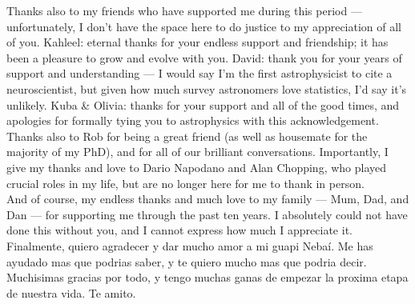 \newpage
\thispagestyle{empty}
Thanks also to my friends who have supported me during this period --- unfortunately, I don't have the space here to do justice to my appreciation of all of you. Kahleel: eternal thanks for your endless support and friendship; it has been a pleasure to grow and evolve with you. David: thank you for your years of support and understanding --- I would say I'm the first astrophysicist to cite a neuroscientist, but given how much survey astronomers love statistics, I'd say it's unlikely. Kuba \& Olivia: thanks for your support and all of the good times, and apologies for formally tying you to astrophysics with this acknowledgement. Thanks also to Rob for being a great friend (as well as housemate for the majority of my PhD), and for all of our brilliant conversations. Importantly, I give my thanks and love to Dario Napodano and Alan Chopping, who played crucial roles in my life, but are no longer here for me to thank in person. \\

And of course, my endless thanks and much love to my family --- Mum, Dad, and Dan --- for supporting me through the past ten years. I absolutely could not have done this without you, and I cannot express how much I appreciate it. \\

Finalmente, quiero agradecer y dar mucho amor a mi guapi Nebaí. Me has ayudado mas que podrias saber, y te quiero mucho mas que podria decir. Muchisimas gracias por todo, y tengo muchas ganas de empezar la proxima etapa de nuestra vida. Te amito.
